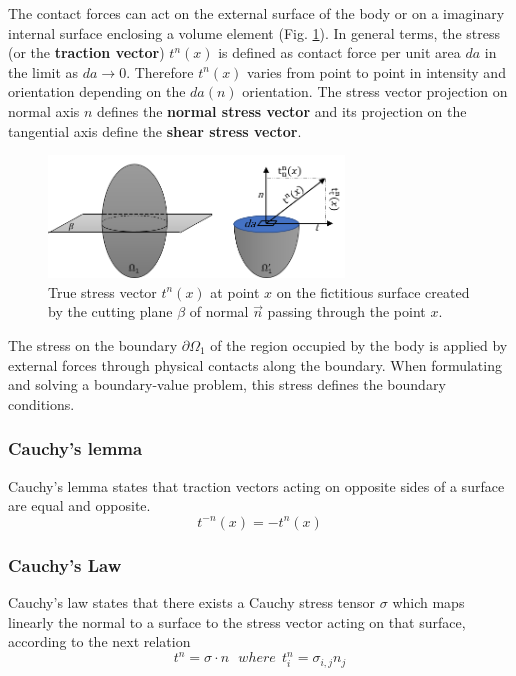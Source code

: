 The contact forces can act on the external surface of the body or on a imaginary internal surface enclosing a volume element (Fig. \ref{internalcontactForceDefinition}). 
In general terms, the stress (or the \textbf{traction vector}) $t^n(x)$ is defined as contact force per unit area $da$ in the limit as $da \rightarrow 0$. Therefore $t^n(x)$ varies from point to point in intensity and orientation depending on the $da(n)$ orientation.  The stress vector projection on normal axis $n$ defines the \textbf{normal stress vector} and its projection on the tangential axis define the \textbf{shear stress vector}.


\begin{figure}
\begin{center}
\includegraphics[width=0.7\textwidth,keepaspectratio]{figures/internalcontactForceDefinition.png} 
\caption[]{True stress vector $t^n(x)$ at point $x$ on the fictitious surface created  by the cutting plane $\beta$ of normal  $\overrightarrow n$ passing through the point $x$. }
\label{internalcontactForceDefinition}
\end{center}
\end{figure}

The stress on the boundary $\partial \Omega_1$ of the region occupied by the body is applied by external forces through physical contacts along the boundary. When formulating and solving a boundary-value problem, this stress defines the boundary conditions.


\subsubsection*{Cauchy's lemma}

Cauchy's lemma states that traction vectors acting on opposite sides of a surface are equal and opposite.
\begin{equation}
t^{-n}(x) = -t^n(x)
\label{chauchyLemma}
\end{equation}
\subsubsection*{Cauchy's Law}
Cauchy’s law states that there exists a Cauchy stress tensor $\sigma$ which maps linearly the normal to a surface to the stress vector acting on that surface, according to the next relation
\begin{equation}
t^n = \sigma \cdot n \ \ \ where \  \ t^n_i = \sigma_{i,j} n_j
\end{equation}

